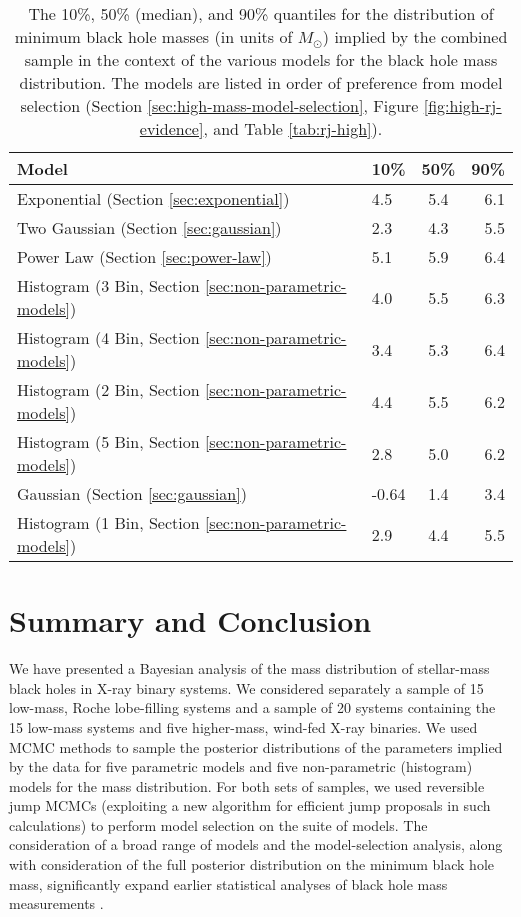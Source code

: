 \documentclass[preprint]{aastex}
\newcommand{\Msun}{M_\odot}
\begin{document}
\begin{table}
  \begin{center}
    \begin{tabular}{|l|l|c|r|}
      \hline
      Model & 10\% & 50\% & 90\% \\
      \hline \hline
      Exponential (Section \ref{sec:exponential}) & 4.5 & 5.4 & 6.1 \\
      \hline
      Two Gaussian (Section \ref{sec:gaussian}) & 2.3 & 4.3 & 5.5 \\
      \hline
      Power Law (Section \ref{sec:power-law}) & 5.1 & 5.9 & 6.4 \\
      \hline
      Histogram (3 Bin, Section \ref{sec:non-parametric-models}) & 4.0 & 5.5 & 6.3 \\
      \hline 
      Histogram (4 Bin, Section \ref{sec:non-parametric-models}) & 3.4 & 5.3 & 6.4 \\
      \hline
      Histogram (2 Bin, Section \ref{sec:non-parametric-models}) & 4.4 & 5.5 & 6.2 \\
      \hline
      Histogram (5 Bin, Section \ref{sec:non-parametric-models}) & 2.8 & 5.0 & 6.2 \\
      \hline
      Gaussian (Section \ref{sec:gaussian}) & -0.64 & 1.4 & 3.4 \\
      \hline 
      Histogram (1 Bin, Section \ref{sec:non-parametric-models}) & 2.9 & 4.4 & 5.5 \\
      \hline
    \end{tabular}
  \end{center}
  \caption{\label{tab:mmin-quants-high} The 10\%, 50\% (median), and 90\% quantiles for the distribution of minimum black hole masses (in units of $\Msun$) implied by the combined sample in the context of the various models for the black hole mass distribution.  The models are listed in order of preference from model selection (Section \ref{sec:high-mass-model-selection}, Figure \ref{fig:high-rj-evidence}, and Table \ref{tab:rj-high}). }
\end{table}

\section{Summary and Conclusion}
\label{sec:conclusion}

We have presented a Bayesian analysis of the mass distribution of
stellar-mass black holes in X-ray binary systems.  We considered
separately a sample of 15 low-mass, Roche lobe-filling systems and a
sample of 20 systems containing the 15 low-mass systems and five
higher-mass, wind-fed X-ray binaries.  We used MCMC methods to sample
the posterior distributions of the parameters implied by the data for
five parametric models and five non-parametric (histogram) models for
the mass distribution.  For both sets of samples, we used reversible
jump MCMCs (exploiting a new algorithm for efficient jump proposals in
such calculations) to perform model selection on the suite of models.
The consideration of a broad range of models and the model-selection
analysis, along with consideration of the full posterior distribution
on the minimum black hole mass, significantly expand earlier
statistical analyses of black hole mass measurements
\citep{Bailyn1998,Ozel2010}.
\end{document}
